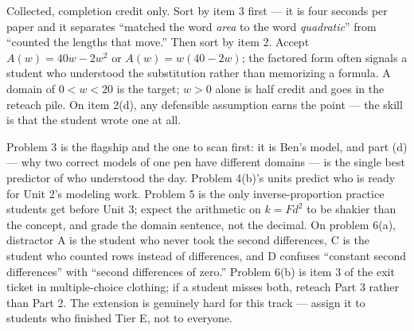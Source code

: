 \documentclass[10pt]{article}
\begin{document}
\begin{teachernote}
Collected, completion credit only. Sort by item 3 first --- it is four seconds
per paper and it separates ``matched the word \textit{area} to the word
\textit{quadratic}'' from ``counted the lengths that move.'' Then sort by item 2.
Accept $A(w) = 40w - 2w^2$ or $A(w) = w(40 - 2w)$; the factored form often
signals a student who understood the substitution rather than memorizing a
formula. A domain of $0 < w < 20$ is the target; $w > 0$ alone is half credit
and goes in the reteach pile. On item 2(d), any defensible assumption earns the
point --- the skill is that the student wrote one at all.
\end{teachernote}

\begin{teachernote}[Homework]
Problem 3 is the flagship and the one to scan first: it is Ben's model, and part
(d) --- why two correct models of one pen have different domains --- is the
single best predictor of who understood the day. Problem 4(b)'s units predict
who is ready for Unit 2's modeling work. Problem 5 is the only
inverse-proportion practice students get before Unit 3; expect the arithmetic on
$k = F d^2$ to be shakier than the concept, and grade the domain sentence, not
the decimal. On problem 6(a), distractor A is the student who never took the
second differences, C is the student who counted rows instead of differences,
and D confuses ``constant second differences'' with ``second differences of
zero.'' Problem 6(b) is item 3 of the exit ticket in multiple-choice clothing;
if a student misses both, reteach Part 3 rather than Part 2. The extension is
genuinely hard for this track --- assign it to students who finished Tier E, not
to everyone.
\end{teachernote}
\end{document}
